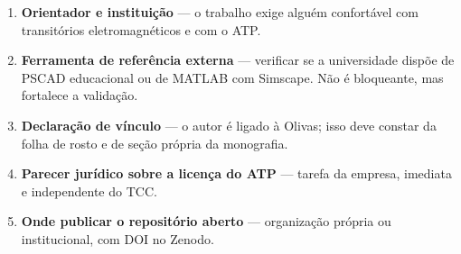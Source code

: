 \documentclass[12pt,a4paper]{article}
\begin{document}
\begin{enumerate}
  \item \textbf{Orientador e instituição} --- o trabalho exige alguém confortável com transitórios
        eletromagnéticos e com o ATP.
  \item \textbf{Ferramenta de referência externa} --- verificar se a universidade dispõe de PSCAD
        educacional ou de MATLAB com Simscape. Não é bloqueante, mas fortalece a validação.
  \item \textbf{Declaração de vínculo} --- o autor é ligado à Olivas; isso deve constar da folha de
        rosto e de seção própria da monografia.
  \item \textbf{Parecer jurídico sobre a licença do ATP} --- tarefa da empresa, imediata e
        independente do TCC.
  \item \textbf{Onde publicar o repositório aberto} --- organização própria ou institucional, com DOI
        no Zenodo.
\end{enumerate}
\end{document}
